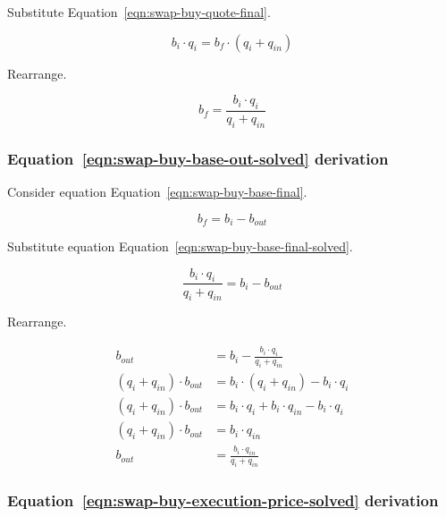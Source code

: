 \documentclass[table, twocolumn]{article}
\begin{document}
Substitute Equation~\ref{eqn:swap-buy-quote-final}.

\begin{equation}
	b_i \cdot q_i = b_f \cdot (q_i + q_{in}) \nonumber
\end{equation}

Rearrange.

\begin{equation}
	b_f = \frac{b_i \cdot q_i}{q_i + q_{in}} \nonumber
\end{equation}

\subsubsection{Equation~\ref{eqn:swap-buy-base-out-solved} derivation}%
\label{sssec:equation-eqn-swap-buy-base-out-solved-derivation}

Consider equation Equation~\ref{eqn:swap-buy-base-final}.

\begin{equation}
	b_f = b_i - b_{out} \nonumber
\end{equation}

Substitute equation Equation~\ref{eqn:swap-buy-base-final-solved}.

\begin{equation}
	\frac{b_i \cdot q_i}{q_i + q_{in}} = b_i - b_{out} \nonumber
\end{equation}

Rearrange.

\begin{align}
	b_{out}                      & = b_i - \frac{b_i \cdot q_i}{q_i + q_{in}} \nonumber \\
	(q_i + q_{in}) \cdot b_{out} & = b_i \cdot (q_i + q_{in})- b_i \cdot q_i \nonumber  \\
	(q_i + q_{in}) \cdot b_{out} & =
	b_i \cdot q_i + b_i \cdot q_{in} - b_i \cdot q_i \nonumber                          \\
	(q_i + q_{in}) \cdot b_{out} & = b_i \cdot q_{in} \nonumber                         \\
	b_{out}                      & = \frac{b_i \cdot q_{in}}{q_i + q_{in}} \nonumber
\end{align}

\subsubsection{Equation~\ref{eqn:swap-buy-execution-price-solved} derivation}%
\label{sssec:equation-eqn-swap-buy-execution-price-solved-derivation}
\end{document}
